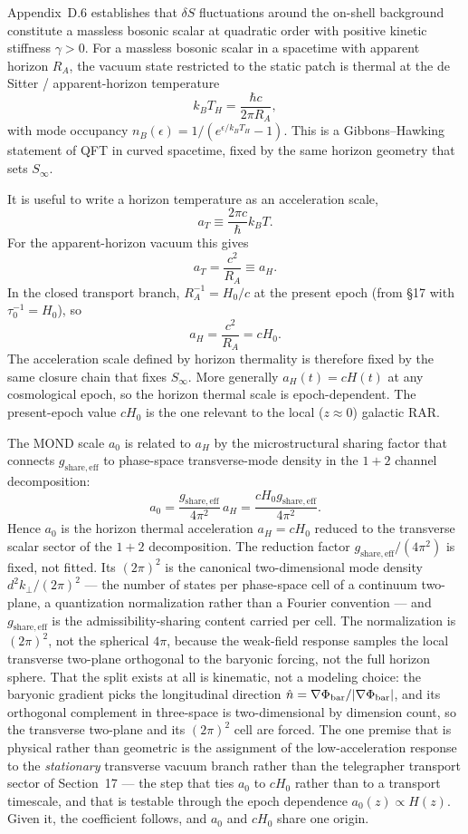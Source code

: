 \documentclass[11pt]{article}
\begin{document}
Appendix~D.6 establishes that $\delta S$ fluctuations around the on-shell background constitute a massless bosonic scalar at quadratic order with positive kinetic stiffness $\gamma>0$. For a massless bosonic scalar in a spacetime with apparent horizon $R_A$, the vacuum state restricted to the static patch is thermal at the de Sitter / apparent-horizon temperature
\[
k_B T_H=\frac{\hbar c}{2\pi R_A},
\]
with mode occupancy $n_B(\epsilon)=1/(e^{\epsilon/k_BT_H}-1)$. This is a Gibbons--Hawking statement of QFT in curved spacetime, fixed by the same horizon geometry that sets $S_\infty$.

It is useful to write a horizon temperature as an acceleration scale,
\[
a_T\equiv\frac{2\pi c}{\hbar}k_BT.
\]
For the apparent-horizon vacuum this gives
\[
a_T=\frac{c^2}{R_A}\equiv a_H.
\]
In the closed transport branch, $R_A^{-1}=H_0/c$ at the present epoch (from \S17 with $\tau_0^{-1}=H_0$), so
\[
a_H=\frac{c^2}{R_A}=cH_0.
\]
The acceleration scale defined by horizon thermality is therefore fixed by the same closure chain that fixes $S_\infty$. More generally $a_H(t)=cH(t)$ at any cosmological epoch, so the horizon thermal scale is epoch-dependent. The present-epoch value $cH_0$ is the one relevant to the local ($z\approx 0$) galactic RAR.

The MOND scale $a_0$ is related to $a_H$ by the microstructural sharing factor that connects $g_{\mathrm{share,eff}}$ to phase-space transverse-mode density in the $1+2$ channel decomposition:
\[
a_0=\frac{g_{\mathrm{share,eff}}}{4\pi^2}\,a_H=\frac{cH_0g_{\mathrm{share,eff}}}{4\pi^2}.
\]
Hence $a_0$ is the horizon thermal acceleration $a_H=cH_0$ reduced to the transverse scalar sector of the $1+2$ decomposition. The reduction factor $g_{\mathrm{share,eff}}/(4\pi^2)$ is fixed, not fitted. Its $(2\pi)^2$ is the canonical two-dimensional mode density $d^2k_\perp/(2\pi)^2$ --- the number of states per phase-space cell of a continuum two-plane, a quantization normalization rather than a Fourier convention --- and $g_{\mathrm{share,eff}}$ is the admissibility-sharing content carried per cell. The normalization is $(2\pi)^2$, not the spherical $4\pi$, because the weak-field response samples the local transverse two-plane orthogonal to the baryonic forcing, not the full horizon sphere. That the split exists at all is kinematic, not a modeling choice: the baryonic gradient picks the longitudinal direction $\hat n=\nabla\Phi_{\rm bar}/|\nabla\Phi_{\rm bar}|$, and its orthogonal complement in three-space is two-dimensional by dimension count, so the transverse two-plane and its $(2\pi)^2$ cell are forced. The one premise that is physical rather than geometric is the assignment of the low-acceleration response to the \emph{stationary} transverse vacuum branch rather than the telegrapher transport sector of Section~17 --- the step that ties $a_0$ to $cH_0$ rather than to a transport timescale, and that is testable through the epoch dependence $a_0(z)\propto H(z)$. Given it, the coefficient follows, and $a_0$ and $cH_0$ share one origin.
\end{document}
